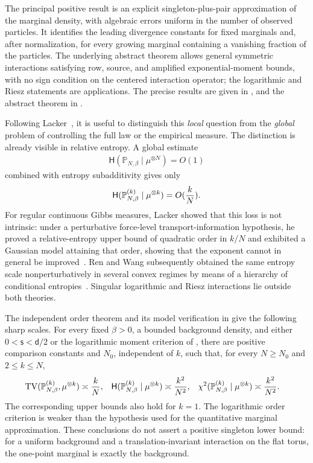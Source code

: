 \documentclass[11pt,reqno]{amsart}
\numberwithin{equation}{section}
\theoremstyle{plain}
\theoremstyle{remark}
\DeclarePairedDelimiter{\pa}{\lparen}{\rparen}
\renewcommand{\d}{\mathsf{d}}
\newcommand{\Pb}{{\mathbb{P}}}
\newcommand{\Hr}{{\mathsf{H}}}
\newcommand{\be}{\beta}
\newcommand{\s}{\mathsf{s}}
\newcommand{\Chi}{\chi^2}
\newcommand{\TV}{\operatorname{TV}}
\begin{document}
The principal positive result is an explicit singleton-plus-pair approximation of the marginal density, with algebraic errors uniform in the number of observed particles.  It identifies the leading divergence constants for fixed marginals and, after normalization, for every growing marginal containing a vanishing fraction of the particles.  The underlying abstract theorem allows general symmetric interactions satisfying row, source, and amplified exponential-moment bounds, with no sign condition on the centered interaction operator; the logarithmic and Riesz statements are applications.  The precise results are given in , and the abstract theorem in .

Following Lacker~\cite{Lacker2022}, it is useful to distinguish this \emph{local} question from the \emph{global} problem of controlling the full law or the empirical measure.  The distinction is already visible in relative entropy.  A global estimate
\begin{align}\label{eq:intro-global-entropy-O1}
 \Hr(\Pb_{N,\be}\mid\mu^{\otimes N})=O(1)
\end{align}
combined with entropy subadditivity gives only
\begin{align}\label{eq:intro-subadditive-local-rate}
 \Hr(\Pb_{N,\be}^{(k)}\mid\mu^{\otimes k})=O\pa{\frac{k}{N}}.
\end{align}
For regular continuous Gibbs measures, Lacker showed that this loss is not intrinsic: under a perturbative force-level transport-information hypothesis, he proved a relative-entropy upper bound of quadratic order in \(k/N\) and exhibited a Gaussian model attaining that order, showing that the exponent cannot in general be improved~\cite{Lacker2022}.  Ren and Wang subsequently obtained the same entropy scale nonperturbatively in several convex regimes by means of a hierarchy of conditional entropies~\cite{RenWang2024}.  Singular logarithmic and Riesz interactions lie outside both theories.

The independent order theorem  and its model verification in  give the following sharp scales.  For every fixed $\be>0$, a bounded background density, and either $0<\s<\d/2$ or the logarithmic moment criterion of , there are positive comparison constants and $N_0$, independent of $k$, such that, for every $N\geq N_0$ and $2\leq k\leq N$,
\begin{align}\label{eq:intro-informal-scales}
 \TV\pa{\Pb_{N,\be}^{(k)},\mu^{\otimes k}}
 &\asymp \frac{k}{N},
 &
 \Hr\pa{\Pb_{N,\be}^{(k)}\mid\mu^{\otimes k}}
 &\asymp \frac{k^2}{N^2},
 &
 \Chi\pa{\Pb_{N,\be}^{(k)}\mid\mu^{\otimes k}}
 &\asymp \frac{k^2}{N^2}.
\end{align}
The corresponding upper bounds also hold for $k=1$.  The logarithmic order criterion is weaker than the hypothesis used for the quantitative marginal approximation.  These conclusions do not assert a positive singleton lower bound: for a uniform background and a translation-invariant interaction on the flat torus, the one-point marginal is exactly the background.
\end{document}
